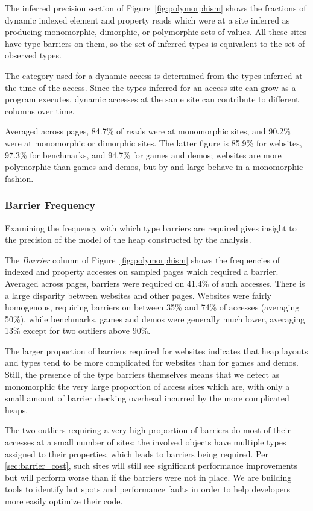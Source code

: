 The inferred precision section of Figure~\ref{fig:polymorphism} shows the fractions
of dynamic indexed element and property reads which were at a site inferred
as producing
monomorphic, dimorphic, or polymorphic sets of values.
All these sites have type barriers on them, so the set of inferred types
is equivalent to the set of observed types.

The category used for a dynamic access is determined from the types
inferred at the time of the access.
Since the types inferred for an access site can grow as a program executes,
dynamic accesses at the same site can contribute to different
columns over time.

Averaged across pages, 84.7\% of reads were at monomorphic
sites, and 90.2\% were at monomorphic or dimorphic sites.
The latter figure is 85.9\% for websites, 97.3\% for benchmarks,
and 94.7\% for games and demos; websites are more polymorphic than games
and demos, but by and large behave in a monomorphic fashion.

\subsubsection{Barrier Frequency}
\label{sec:barriers}

Examining the frequency with which type barriers are required
gives insight to the precision of the model of the heap constructed by
the analysis.

The {\it Barrier} column of Figure~\ref{fig:polymorphism} shows the frequencies of
indexed and property accesses on sampled pages which required a barrier.
Averaged across pages, barriers were required on 41.4\% of such accesses.
There is a large disparity between websites and other pages.
Websites were fairly homogenous, requiring barriers on between 35\%
and 74\% of accesses (averaging 50\%), while benchmarks,
games and demos were generally
much lower, averaging 13\% except for two outliers above 90\%.

The larger proportion of barriers required for websites indicates that
heap layouts and types tend to be more complicated for websites than for
games and demos.
Still, the presence of the type barriers themselves means that we
detect as monomorphic the very large proportion of access sites which are,
with only a small amount of barrier checking overhead incurred by the
more complicated heaps.

The two outliers requiring a very high proportion of barriers do most of
their accesses at a small number of sites; the involved objects have
multiple types assigned to their properties, which leads to barriers being
required.
Per \Section\ref{sec:barrier_cost}, such sites will still see significant
performance improvements but will perform worse than if the barriers were
not in place.
We are building tools to identify hot spots and performance
faults in order to help developers more easily optimize their code.

